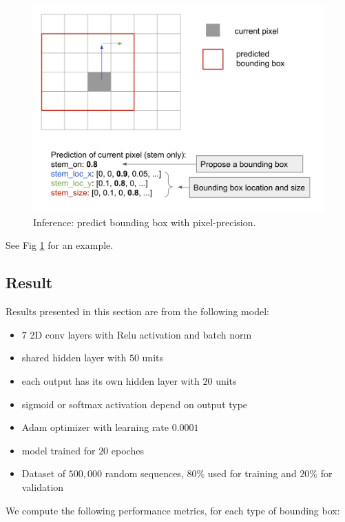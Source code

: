 \documentclass[12pt]{article}
\begin{document}
\begin{figure}[h]
    \centering
    \includegraphics[width=\textwidth]{plot/inference_bb_prediction.png}
    \caption{Inference: predict bounding box with pixel-precision.}
    \label{fig:inference_bb_prediction}
    \centering
\end{figure}


See Fig \ref{fig:inference_bb_prediction} for an example.


\subsection{Result}

Results presented in this section are from the following model:

\begin{itemize}
    \item $7$ 2D conv layers with Relu activation and batch norm
    \item shared hidden layer with $50$ units
    \item each output has its own hidden layer with $20$ units
    \item sigmoid or softmax activation depend on output type
    \item Adam optimizer with learning rate $0.0001$
    \item model trained for $20$ epoches
    \item Dataset of $500,000$ random sequences, $80\%$ used for training and $20\%$ for validation
\end{itemize}

We compute the following performance metrics, for each type of bounding box:
\end{document}
